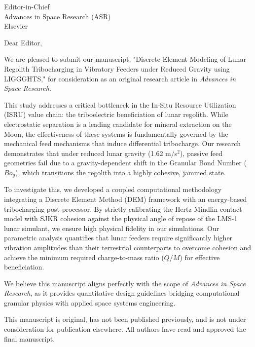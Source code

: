 \documentclass[11pt]{letter}
\begin{document}
\begin{letter}{
    Editor-in-Chief \\
    Advances in Space Research (ASR) \\
    Elsevier
}

\opening{Dear Editor,}

We are pleased to submit our manuscript, "Discrete Element Modeling of Lunar Regolith Tribocharging in Vibratory Feeders under Reduced Gravity using LIGGGHTS," for consideration as an original research article in \textit{Advances in Space Research}.

This study addresses a critical bottleneck in the In-Situ Resource Utilization (ISRU) value chain: the triboelectric beneficiation of lunar regolith. While electrostatic separation is a leading candidate for mineral extraction on the Moon, the effectiveness of these systems is fundamentally governed by the mechanical feed mechanisms that induce differential tribocharge. Our research demonstrates that under reduced lunar gravity (1.62 m/s$^2$), passive feed geometries fail due to a gravity-dependent shift in the Granular Bond Number ($Bo_g$), which transitions the regolith into a highly cohesive, jammed state.

To investigate this, we developed a coupled computational methodology integrating a Discrete Element Method (DEM) framework with an energy-based tribocharging post-processor. By strictly calibrating the Hertz-Mindlin contact model with SJKR cohesion against the physical angle of repose of the LMS-1 lunar simulant, we ensure high physical fidelity in our simulations. Our parametric analysis quantifies that lunar feeders require significantly higher vibration amplitudes than their terrestrial counterparts to overcome cohesion and achieve the minimum required charge-to-mass ratio ($Q/M$) for effective beneficiation.

We believe this manuscript aligns perfectly with the scope of \textit{Advances in Space Research}, as it provides quantitative design guidelines bridging computational granular physics with applied space systems engineering. 

This manuscript is original, has not been published previously, and is not under consideration for publication elsewhere. All authors have read and approved the final manuscript.


\end{letter}
\end{document}
